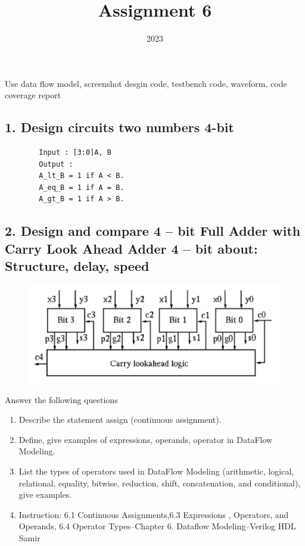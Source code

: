 \documentclass{vhdl-assignment}
\title{Assignment 6}
\date{2023}
\begin{document}
\maketitle
\thispagestyle{fancy}

\begin{problem}{Use data flow model, screenshot desgin code, testbench code, waveform, code coverage report}
    \subsection*{1. Design circuits two numbers 4-bit}
    \begin{verbatim}
        Input : [3:0]A, B
        Output : 
        A_lt_B = 1 if A < B.
        A_eq_B = 1 if A = B.
        A_gt_B = 1 if A > B.
    \end{verbatim}

    \subsection*{2. Design and compare 4 – bit Full Adder with Carry Look Ahead Adder 4 – bit about: Structure, delay, speed}
    \begin{figure}[H]
        \centering
        \includegraphics{assets/CarryLookAheadAdder.jpg}
    \end{figure}
\end{problem}

\begin{problem}{Answer the following questions}
    \begin{enumerate}
        \item Describe the statement assign (continuous assignment).
        \item Define, give examples of expressions, operands, operator in DataFlow Modeling.
        \item List the types of operators used in DataFlow Modeling (arithmetic, logical, relational, equality, bitwise, reduction, shift, concatenation, and conditional), give examples.
        \item Instruction: 6.1 Continuous Assignments,6.3 Expressions , Operators, and Operands, 6.4 Operator Types–Chapter 6. Dataflow Modeling–Verilog HDL Samir
    \end{enumerate}
\end{problem}
\end{document}
